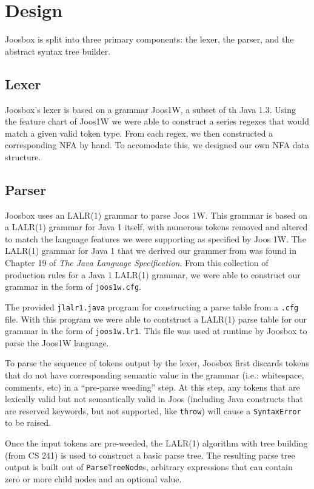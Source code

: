 \documentclass[letterpaper]{article}
\begin{document}
  \section{Design}

  Joosbox is split into three primary components: the lexer, the parser, and
  the abstract syntax tree builder.

  \subsection{Lexer}

  Joosbox's lexer is based on a grammar Joos1W, a subset of th Java 1.3. Using
  the feature chart of Joos1W we were able to construct a series regexes that
  would match a given valid token type. From each regex, we then constructed a
  corresponding NFA by hand. To accomodate this, we designed our own NFA data
  structure.

  \subsection{Parser}

  Joosbox uses an LALR(1) grammar to parse Joos 1W. This grammar is based on a
  LALR(1) grammar for Java 1 itself, with numerous tokens removed and altered to
  match the language features we were supporting as specified by Joos 1W. The
  LALR(1) grammar for Java 1 that we derived our grammer from was found in
  Chapter 19 of {\em The Java Language Specification}. From this collection of
  production rules for a Java 1 LALR(1) grammar, we were able to construct our
  grammar in the form of {\tt joos1w.cfg}.

  The provided {\tt jlalr1.java} program for constructing a parse table from a
  {\tt .cfg} file. With this program we were able to contstruct a LALR(1) parse
  table for our grammar in the form of {\tt joos1w.lr1}. This file was used at
  runtime by Joosbox to parse the Joos1W language.

  To parse the sequence of tokens output by the lexer, Joosbox first discards
  tokens that do not have corresponding semantic value in the grammar (i.e.:
  whitespace, comments, etc) in a ``pre-parse weeding'' step. At this step,
  any tokens that are lexically valid but not semantically valid in Joos
  (including Java constructs that are reserved keywords, but not supported,
  like {\tt throw}) will cause a {\tt SyntaxError} to be raised.

  Once the input tokens are pre-weeded, the LALR(1) algorithm with tree building
  (from CS 241) is used to construct a basic parse tree. The resulting parse 
  tree output is built out of {\tt ParseTreeNode}s, arbitrary expressions
  that can contain zero or more child nodes and an optional value.
\end{document}
